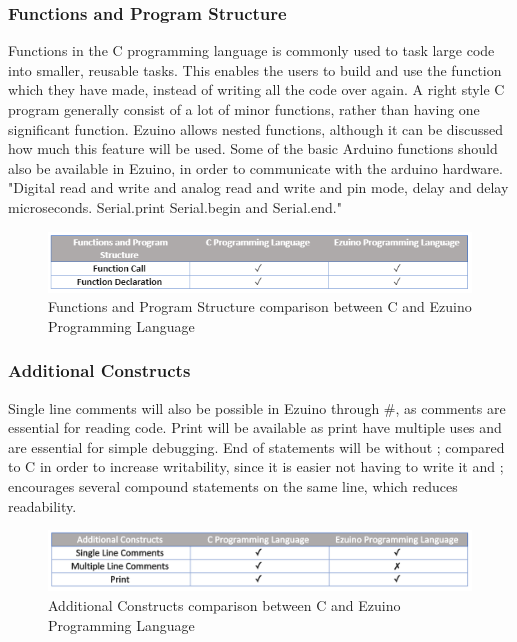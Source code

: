 \subsubsection*{Functions and Program Structure}
Functions in the C programming language is commonly used to task large code into smaller, reusable tasks. This enables the users to build and use the function which they have made, instead of writing all the code over again. A right style C program generally consist of a lot of minor functions, rather than having one significant function. 
Ezuino allows nested functions, although it can be discussed how much this feature will be used.
Some of the basic Arduino functions should also be available in Ezuino, in order to communicate with the arduino hardware.  "Digital read and write and analog read and write and pin mode, delay and delay microseconds. Serial.print Serial.begin and Serial.end."
\begin{figure}[H]
\centering
\includegraphics[scale=0.80]{figures/language_features/langf10.png}
\caption{Functions and Program Structure comparison between C and Ezuino Programming Language}
\label{lf10}
\end{figure}
\subsubsection*{Additional Constructs}
Single line comments will also be possible in Ezuino through #, as comments are essential for reading code. Print will be available as print have multiple uses and are essential for simple debugging. End of statements will be without ; compared to C in order to increase writability, since it is easier not having to write it and ; encourages several compound statements on the same line, which reduces readability. 
\begin{figure}[H]
\centering
\includegraphics[scale=0.60]{figures/language_features/langf09.png}
\caption{Additional Constructs comparison between C and Ezuino Programming Language}
\label{lf09}
\end{figure}
